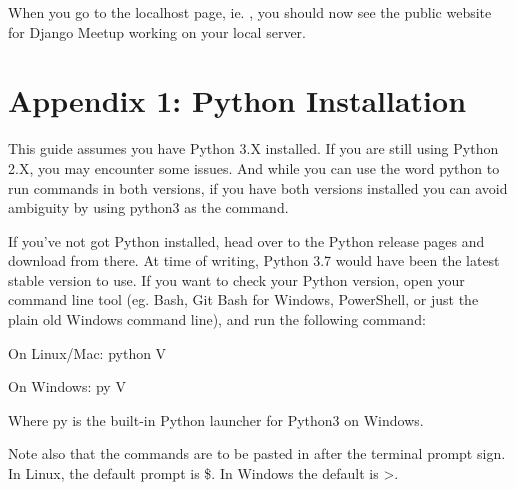 \documentclass[letterpaper,10pt,english]{sphinxmanual}
\begin{document}
\begin{sphinxVerbatim}[commandchars=\\\{\}]
 
  

 
  
\end{sphinxVerbatim}

When you go to the localhost page, ie. , you should now see the public website for Django Meetup working on your local server.



\section{Appendix 1: Python Installation}
\label{\detokenize{guide/80_python:appendix-1-python-installation}}\label{\detokenize{guide/80_python::doc}}
This guide assumes you have Python 3.X installed.  If you are still using Python 2.X, you may encounter some issues.   And while you can use the word python to run commands in both versions, if you have both versions installed you can avoid ambiguity by using python3 as the command.

If you’ve not got Python installed, head over to the Python release pages and download from there.  At time of writing, Python 3.7 would have been the latest stable version to use.
If you want to check your Python version, open your command line tool (eg. Bash, Git Bash for Windows, PowerShell, or just the plain old Windows command line), and run the following command:

\begin{sphinxVerbatim}[commandchars=\\\{\}]
On Linux/Mac:
python \textendash{}V

On Windows:
py \PYGZhy{}V
\end{sphinxVerbatim}

Where py is the built-in Python launcher for Python3 on Windows.

Note also that the commands are to be pasted in after the terminal prompt sign.  In Linux, the default prompt is \$. In Windows the default is \textgreater{}.
\end{document}

